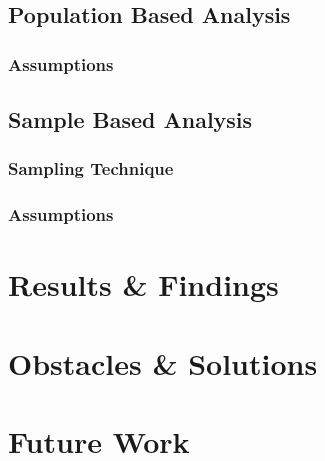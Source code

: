 \documentclass{article}
\begin{document}
\subsection{Population Based Analysis}
\subsubsection{Assumptions}



\subsection{Sample Based Analysis}
\subsubsection{Sampling Technique}


\subsubsection{Assumptions}



\section{Results \& Findings}






\section{Obstacles \& Solutions}




\section{Future Work}
\end{document}

